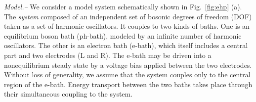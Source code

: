 \documentclass[aps
,twocolumn
,floatfix,footinbib,prl
]{revtex4-1}
\begin{document}








\emph{Model.--} 
We consider a model system schematically shown in Fig.~\ref{fig:ehp} (a). The \emph{system} composed of an independent set of bosonic degrees of freedom (DOF) taken as a set of harmonic oscillators. It couples to two kinds of baths. One is an equilibrium boson bath (ph-bath), modeled by an infinite number of harmonic oscillators. The other is an electron bath (e-bath), which itself includes a central part and two electrodes (L and R).  The e-bath may be driven into a nonequilibrium steady state by a voltage bias applied between the two electrodes. Without loss of generality, we assume that the system couples only to the central region of the e-bath. Energy transport between the two baths takes place through their simultaneous coupling to the system. 
\end{document}
